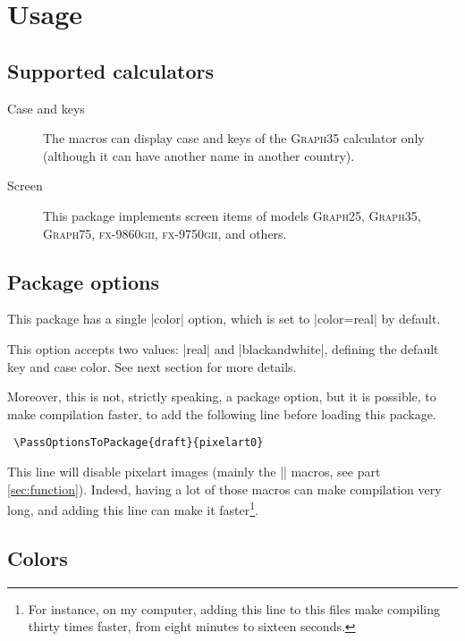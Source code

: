 \documentclass{ltxdoc}
\begin{document}
 \section{Usage}
 \label{sec:usage}

 \subsection{Supported calculators}

 \begin{description}
   \item[Case and keys] The macros can display case and keys of the \textsc{Graph35} calculator only (although it can have another name in another country).
 \item[Screen] This package implements screen items of models \textsc{Graph25}, \textsc{Graph35}, \textsc{Graph75}, \textsc{fx-9860gii}, \textsc{fx-9750gii}, and others.
 \end{description}

 \subsection{Package options}

 This package has a single |color| option, which is set to |color=real| by default.

 This option accepts two values: |real| and |blackandwhite|, defining the default key and case color. See next section for more details.

 Moreover, this is not, strictly speaking, a package option, but it is possible, to make compilation faster, to add the following line before loading this package.

 \begin{lstlisting}
 \PassOptionsToPackage{draft}{pixelart0}
 \end{lstlisting}

 This line will disable pixelart images (mainly the |\function| macros, see part \ref{sec:function}). Indeed, having a lot of those macros can make compilation very long, and adding this line can make it faster\footnote{For instance, on my computer, adding this line to this files make compiling thirty times faster, from eight minutes to sixteen seconds.}.

 \subsection{Colors}
 \label{sec:colors}
\end{document}
